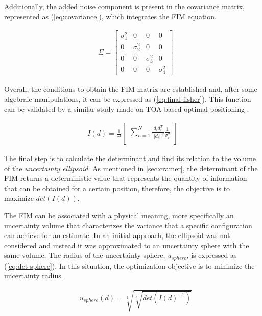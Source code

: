 Additionally, the added noise component is present in the covariance matrix, represented as (\ref{eq:covariance}), which integrates the FIM equation.

\begin{eqnarray}
	& \Sigma = 
	\begin{bmatrix}
		\sigma_1^2 & 0 & 0 & 0 \\
		0 & \sigma_2^2 & 0 & 0 \\
		0 & 0  & \sigma_3^2  & 0 \\
		0 & 0 & 0 & \sigma_4^2 
	\end{bmatrix}
	\label{eq:covariance}
\end{eqnarray}

Overall, the conditions to obtain the FIM matrix are established and, after some algebraic manipulations, it can be expressed as (\ref{eq:final-fisher}). This function can be validated by a similar study made on TOA based optimal positioning \cite{cramer-bruno}.

\begin{eqnarray}
	I(d) = \frac{1}{c^2} 
	\begin{bmatrix}
		\sum_{n=1}^{N} \frac{d_i d_i^T}{||d_i||^2} \frac{1}{\sigma_i^2}\\
	\end{bmatrix}
	\label{eq:final-fisher}
\end{eqnarray}

The final step is to calculate the determinant and find its relation to the volume of the \textit{uncertainty ellipsoid}. As mentioned in \ref{sec:cramer}, the determinant of the FIM returns a deterministic value that represents the quantity of information that can be obtained for a certain position, therefore, the objective is to maximize $det(I(d))$.

The FIM can be associated with a physical meaning, more specifically an uncertainty volume that characterizes the variance that a specific configuration can achieve for an estimate. In an initial approach, the ellipsoid was not considered and instead it was approximated to an uncertainty sphere with the same volume. The radius of the uncertainty sphere, $u_{sphere}$, is expressed as (\ref{eq:det-sphere}). In this situation, the optimization objective is to minimize the uncertainty radius.

\begin{eqnarray}
	& u_{sphere}(d) = \sqrt[2]{\sqrt[3]{det(I(d)^{-1})}}
	\label{eq:det-sphere}
\end{eqnarray}

